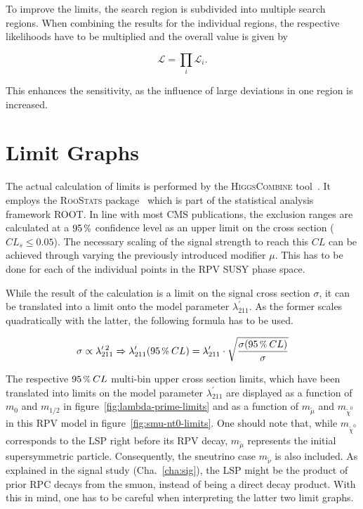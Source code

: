 
To improve the limits, the search region is subdivided into multiple search regions. When combining the results for the individual regions, the respective likelihoods have to be multiplied and the overall value is given by

\begin{equation}
  \label{eq:likelihood-product}
  \mathcal{L} = \prod_i \mathcal{L}_i.
\end{equation}

\noindent This enhances the sensitivity, as the influence of large deviations in one region is increased.

\section{Limit Graphs}
\label{sec:limit-graphs}

The actual calculation of limits is performed by the \textsc{HiggsCombine} tool~\cite{clsmod,higgscombine}. It employs the \textsc{RooStats} package~\cite{roostats} which is part of the statistical analysis framework \textsc{ROOT}. In line with most CMS publications, the exclusion ranges are calculated at a $95\,\pct$ confidence level as an upper limit on the cross section ($CL_s \leq 0.05$). The necessary scaling of the signal strength to reach this $CL$ can be achieved through varying the previously introduced modifier $\mu$. This has to be done for each of the individual points in the RPV SUSY phase space.

While the result of the calculation is a limit on the signal cross section $\sigma$, it can be translated into a limit onto the model parameter $\lambda^\prime_{211}$. As the former scales quadratically with the latter, the following formula has to be used.

\begin{equation}
  \label{eq:xs-lambda-scale}
  \sigma \propto \lambda^{\prime\:2}_{211} \Rightarrow \lambda^\prime_{211} (95\,\pct\: CL) = \lambda^\prime_{211} \cdot \sqrt{ \frac{\sigma (95\,\pct\: CL)}{\sigma} } 
\end{equation}

The respective $95\,\pct\: CL$ multi-bin upper cross section limits, which have been translated into limits on the model parameter $\lambda^{\prime}_{211}$ are displayed as a function of $m_0$ and $m_{1/2}$ in figure~\ref{fig:lambda-prime-limits} and as a function of $m_{\tilde{\mu}}$ and $m_{\tilde{\chi}^0}$ in this RPV model in figure~\ref{fig:smu-nt0-limits}. One should note that, while $m_{\tilde{\chi}^0}$ corresponds to the LSP right before its RPV decay, $m_{\tilde{\mu}}$ represents the initial supersymmetric particle. Consequently, the sneutrino case $m_{\tilde{\nu}}$ is also included. As explained in the signal study (Cha.~\ref{cha:sig}), the LSP might be the product of prior RPC decays from the smuon, instead of being a direct decay product. With this in mind, one has to be careful when interpreting the latter two limit graphs.

